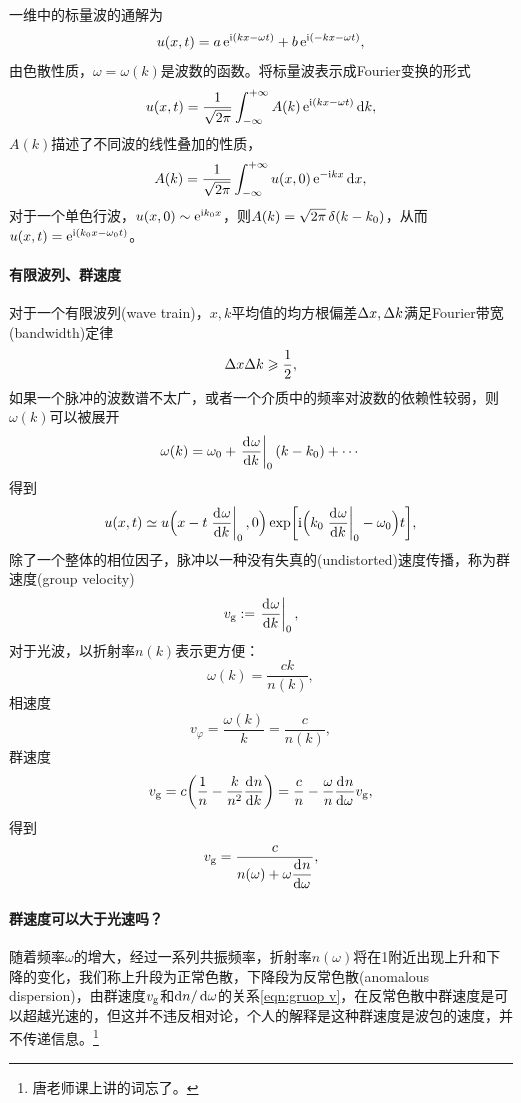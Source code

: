 一维中的标量波的通解为
\[
    u(x,t)=a\mathop{}\!\mathrm{e}^{\mathrm{i}(kx-\omega t)}+b\mathop{}\!\mathrm{e}^{\mathrm{i}(-kx-\omega t)},
\]
由色散性质，$\omega=\omega(k)$是波数的函数。将标量波表示成Fourier变换的形式
\[
    u(x,t)=\frac1{\sqrt{2\pi}}\int_{-\infty}^{+\infty} A(k)\mathop{}\!\mathrm{e}^{\mathrm{i}(kx-\omega t)}\mathop{}\!\mathrm{d} k,
\]
$A(k)$描述了不同波的线性叠加的性质，
\[
    A(k)=\frac1{\sqrt{2\pi}}\int_{-\infty}^{+\infty} u(x,0)\mathop{}\!\mathrm{e}^{-\mathrm{i} kx}\mathop{}\!\mathrm{d} x,
\]
对于一个单色行波，$u(x,0)\sim\mathop{}\!\mathrm{e}^{\mathrm{i} k_0x}$，则$A(k)=\sqrt{2\pi}\mathop{}\!\delta(k-k_0)$，从而$u(x,t)=\mathop{}\!\mathrm{e}^{\mathrm{i}(k_0x-\omega_0t)}$。

\paragraph{有限波列、群速度}

对于一个有限波列(wave train)，$x,k$平均值的均方根偏差$\Delta x,\Delta k$满足Fourier带宽(bandwidth)定律
\begin{equation}
    \Delta x\Delta k\geqslant\frac12,
\end{equation}
如果一个脉冲的波数谱不太广，或者一个介质中的频率对波数的依赖性较弱，则$\omega(k)$可以被展开
\[
    \omega(k)=\omega_0+\left.\frac{\mathrm{d}^{{}}\omega}{\mathrm{d}{k}^{{}}}\right\rvert_0(k-k_0)+\cdots
\]
得到 
\[
    u(x,t)\simeq u\Bigl(x-t\left.\frac{\mathrm{d}^{{}}\omega}{\mathrm{d}{k}^{{}}}\right\rvert_0,0\Bigr)\exp\biggl[\mathrm{i}\Bigl(k_0\left.\frac{\mathrm{d}^{{}}\omega}{\mathrm{d}{k}^{{}}}\right\rvert_0-\omega_0\Bigr)t\biggr],
\]
除了一个整体的相位因子，脉冲以一种没有失真的(undistorted)速度传播，称为群速度(group velocity)
\begin{equation}
    v_\text g:=\left.\frac{\mathrm{d}^{{}}\omega}{\mathrm{d}{k}^{{}}}\right\rvert_0,
\end{equation}
对于光波，以折射率$n(k)$表示更方便：
\[
    \omega(k)=\frac{ck}{n(k)},
\]
相速度
\[
    v_\varphi=\frac{\omega(k)}k=\frac c{n(k)},
\]
群速度
\[
    v_\text g=c\biggl(\frac1n-\frac k{n^2}\frac{\mathrm{d}^{{}}n}{\mathrm{d}{k}^{{}}}\biggr)=\frac cn-\frac\omega n\frac{\mathrm{d}^{{}}n}{\mathrm{d}{\omega}^{{}}} v_\text g,
\]
得到 
\begin{equation}
    \label{eqn:gruop v}
    v_\text g=\frac c{\displaystyle n(\omega)+\omega\frac{\mathrm{d}^{{}}n}{\mathrm{d}{\omega}^{{}}}},
\end{equation}

\paragraph{群速度可以大于光速吗？}

随着频率$\omega$的增大，经过一系列共振频率，折射率$n(\omega)$将在1附近出现上升和下降的变化，我们称上升段为正常色散，下降段为反常色散(anomalous dispersion)，由群速度$v_\text g$和$\mathop{}\!\mathrm{d} n/\mathop{}\!\mathrm{d}\omega$的关系\eqref{eqn:gruop v}，在反常色散中群速度是可以超越光速的，但这并不违反相对论，个人的解释是这种群速度是波包的速度，并不传递信息。\footnote{唐老师课上讲的词忘了。}

